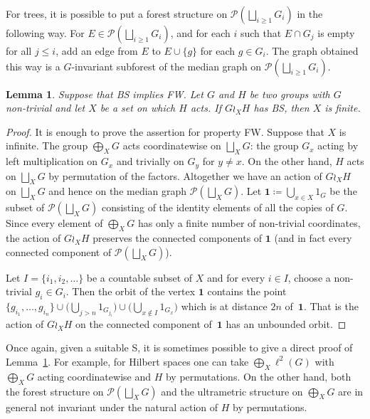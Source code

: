 \documentclass[a4paper]{article}
\newtheorem{lem}{Lemma}[section]
\theoremstyle{definition}
\newcommand*{\powerset}[1]{\mathcal P(#1)}
\begin{document}
For trees, it is possible to put a forest structure on $\powerset{\bigsqcup_{i\geq 1} G_i}$ in the following way.
For $E\in\powerset{\bigsqcup_{i\geq 1} G_i}$, and for each $i$ such that $E\cap G_j$ is empty for all $j\leq i$, add an edge from $E$ to $E\cup\{g\}$ for each $g\in G_i$. The graph obtained this way is a $G$-invariant subforest of the median graph on $\powerset{\bigsqcup_{i\geq 1} G_i}$.
%
%
\begin{lem}\label{Lemma:XFinite}
Suppose that BS implies FW.
Let $G$ and $H$ be two groups with $G$ non-trivial and let $X$ be a set on which $H$ acts.
If $G\wr_XH$ has BS, then $X$ is finite.
\end{lem}
\begin{proof}
It is enough to prove the assertion for property FW.
Suppose that $X$ is infinite.
The group $\bigoplus_XG$ acts coordinatewise on  $\bigsqcup_XG$: the group $G_x$ acting by left multiplication on $G_x$ and trivially on $G_y$ for $y\neq x$. On the other hand, $H$ acts on $\bigsqcup_XG$ by permutation of the factors.
Altogether we have an action of $G\wr_XH$ on $\bigsqcup_XG$ and hence on the median graph $\powerset{\bigsqcup_XG}$.
Let $\mathbf 1\coloneqq\bigcup_{x\in X} 1_{G}$ be the subset of $\powerset{\bigsqcup_XG}$ consisting of the identity elements of all the copies of $G$.
Since every element of $\bigoplus_XG$ has only a finite number of non-trivial coordinates, the action of $G\wr_XH$ preserves the connected components of $\mathbf 1$ (and in fact every connected component of $\powerset{\bigsqcup_XG}$).

Let $I=\{i_1,i_2,\dots\}$ be a countable subset of $X$ and for every $i\in I$, choose a non-trivial $g_i\in G_{i}$.
Then the orbit of the vertex $\mathbf 1$ contains the point $\{g_{i_1},\dots, g_{i_n}\}\cup\bigl(\bigcup_{j>n} 1_{G_{j_i}}\bigr)\cup\bigl(\bigcup_{x\notin I} 1_{G_{x}}\bigr)$ which is at distance $2n$ of~$\mathbf 1$.
That is the action of $G\wr_XH$ on the connected component of~$\mathbf 1$ has an unbounded orbit.
\end{proof}
%
%
Once again, given a suitable S, it is sometimes possible to give a direct proof of Lemma~\ref{Lemma:XFinite}.
For example, for Hilbert spaces one can take $\bigoplus_X\ell^2(G)$ with $\bigoplus_XG$ acting coordinatewise and $H$ by permutations.
On the other hand, both the forest structure on $\powerset{\bigsqcup_XG}$ and the ultrametric structure on $\bigoplus_XG$ are in general not invariant under the natural action of $H$ by permutations.
\end{document}
